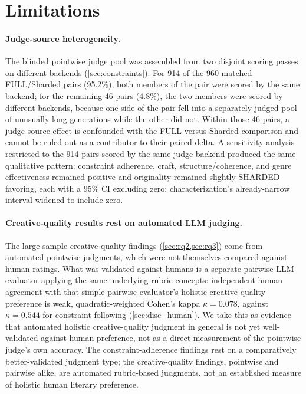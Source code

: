\section{Limitations}
\label{sec:limitations}

\paragraph{Judge-source heterogeneity.} The blinded pointwise judge pool was assembled from two disjoint scoring passes on different backends (\cref{sec:constraints}). For 914 of the 960 matched FULL/Sharded pairs (95.2\%), both members of the pair were scored by the same backend; for the remaining 46 pairs (4.8\%), the two members were scored by different backends, because one side of the pair fell into a separately-judged pool of unusually long generations while the other did not. Within those 46 pairs, a judge-source effect is confounded with the FULL-versus-Sharded comparison and cannot be ruled out as a contributor to their paired delta. A sensitivity analysis restricted to the 914 pairs scored by the same judge backend produced the same qualitative pattern: constraint adherence, craft, structure/coherence, and genre effectiveness remained positive and originality remained slightly SHARDED-favoring, each with a 95\% CI excluding zero; characterization's already-narrow interval widened to include zero.

\paragraph{Creative-quality results rest on automated LLM judging.} The large-sample creative-quality findings (\cref{sec:rq2,sec:rq3}) come from automated pointwise judgments, which were not themselves compared against human ratings. What was validated against humans is a separate pairwise LLM evaluator applying the same underlying rubric concepts: independent human agreement with that simple pairwise evaluator's holistic creative-quality preference is weak, quadratic-weighted Cohen's kappa $\kappa = 0.078$, against $\kappa = 0.544$ for constraint following (\cref{sec:disc_human}). We take this as evidence that automated holistic creative-quality judgment in general is not yet well-validated against human preference, not as a direct measurement of the pointwise judge's own accuracy. The constraint-adherence findings rest on a comparatively better-validated judgment type; the creative-quality findings, pointwise and pairwise alike, are automated rubric-based judgments, not an established measure of holistic human literary preference.

